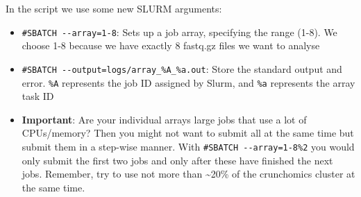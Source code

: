 \documentclass[
  letterpaper,
  DIV=11,
  numbers=noendperiod]{scrreprt}
\newenvironment{Shaded}{}{}
\newcommand{\AttributeTok}[1]{\textcolor[rgb]{0.84,0.23,0.29}{#1}}
\newcommand{\BuiltInTok}[1]{\textcolor[rgb]{0.84,0.23,0.29}{#1}}
\newcommand{\CommentTok}[1]{\textcolor[rgb]{0.42,0.45,0.49}{#1}}
\newcommand{\ExtensionTok}[1]{\textcolor[rgb]{0.84,0.23,0.29}{\textbf{#1}}}
\newcommand{\FunctionTok}[1]{\textcolor[rgb]{0.44,0.26,0.76}{#1}}
\newcommand{\KeywordTok}[1]{\textcolor[rgb]{0.84,0.23,0.29}{#1}}
\newcommand{\NormalTok}[1]{\textcolor[rgb]{0.14,0.16,0.18}{#1}}
\newcommand{\OperatorTok}[1]{\textcolor[rgb]{0.14,0.16,0.18}{#1}}
\newcommand{\PreprocessorTok}[1]{\textcolor[rgb]{0.84,0.23,0.29}{#1}}
\newcommand{\StringTok}[1]{\textcolor[rgb]{0.01,0.18,0.38}{#1}}
\newcommand{\VariableTok}[1]{\textcolor[rgb]{0.89,0.38,0.04}{#1}}
\providecommand{\tightlist}{%
  \setlength{\itemsep}{0pt}\setlength{\parskip}{0pt}}\usepackage{longtable,booktabs,array}
\begin{document}
\begin{tcolorbox}
\begin{Shaded}
\end{Shaded}

In the script we use some new SLURM arguments:

\begin{itemize}
\tightlist
\item
  \texttt{\#SBATCH\ -\/-array=1-8}: Sets up a job array, specifying the
  range (1-8). We choose 1-8 because we have exactly 8 fastq.gz files we
  want to analyse
\item
  \texttt{\#SBATCH\ -\/-output=logs/array\_\%A\_\%a.out}: Store the
  standard output and error. \texttt{\%A} represents the job ID assigned
  by Slurm, and \texttt{\%a} represents the array task ID
\item
  \textbf{Important}: Are your individual arrays large jobs that use a
  lot of CPUs/memory? Then you might not want to submit all at the same
  time but submit them in a step-wise manner. With
  \texttt{\#SBATCH\ -\/-array=1-8\%2} you would only submit the first
  two jobs and only after these have finished the next jobs. Remember,
  try to use not more than \textasciitilde20\% of the crunchomics
  cluster at the same time.
\end{itemize}


\end{tcolorbox}
\end{document}

